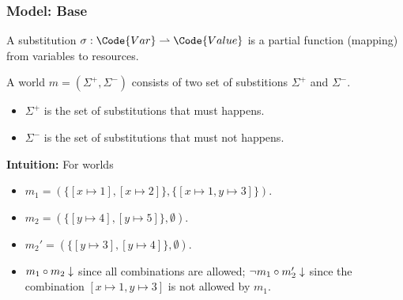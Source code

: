 \begin{frame}[fragile]
    \frametitle{Model: Base}

\begin{definition}[Substitution]
    A substitution $\sigma: \Code{Var} \rightharpoonup \Code{Value}$ is a partial function (mapping) from variables to resources.
\end{definition}

\begin{definition}[World]
    A world $m = (\Sigma^+, \Sigma^-)$ consists of two set of substitions $\Sigma^+$ and $\Sigma^-$.
    \begin{itemize}
        \item $\Sigma^+$ is the set of substitutions that must happens.
        \item $\Sigma^-$ is the set of substitutions that must not happens.
    \end{itemize}
\end{definition}

\textbf{Intuition:} For worlds 
\begin{itemize}
    \item $m_1 = (\{[x\mapsto 1], [x\mapsto 2]\}, \{[x\mapsto 1,y\mapsto 3]\})$.
    \item $m_2 = (\{[y\mapsto 4], [y\mapsto 5]\}, \emptyset)$.
    \item $m_2' = (\{[y\mapsto 3], [y\mapsto 4]\}, \emptyset)$.
    \item $m_1 \circ m_2 \downarrow$ since all combinations are allowed; $\neg m_1 \circ m_2' \downarrow$ since the combination $[x\mapsto 1,y\mapsto 3]$ is not allowed by $m_1$.
\end{itemize}
        
\end{frame}

